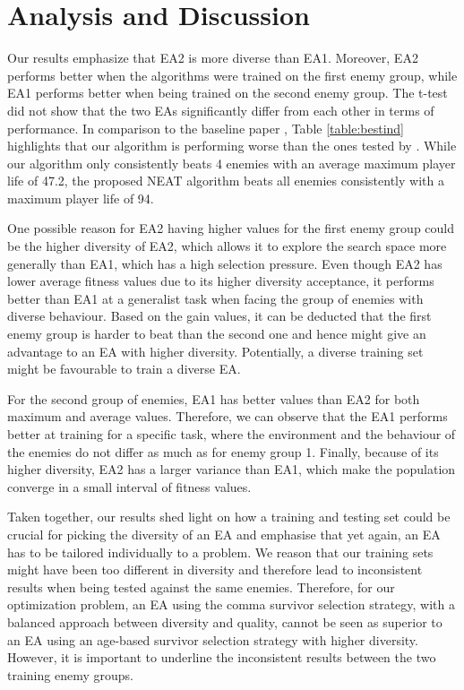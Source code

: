 \section{Analysis and Discussion}

Our results emphasize that EA2 is more diverse than EA1. Moreover, EA2 performs better when the algorithms were trained on the first enemy group, while EA1 performs better when being trained on the second enemy group. The t-test did not show that the two EAs significantly differ from each other in terms of performance. In comparison to the baseline paper \cite{Arajo2016EvolvingAG}, Table \ref{table:bestind} highlights that our algorithm is performing worse than the ones tested by \cite{Arajo2016EvolvingAG}. While our algorithm only consistently beats 4 enemies with an average maximum player life of 47.2, the proposed NEAT algorithm beats all enemies consistently with a maximum player life of 94.

One possible reason for EA2 having higher values for the first enemy group could be the higher diversity of EA2, which allows it to explore the search space more generally than EA1, which has a high selection pressure. Even though EA2 has lower average fitness values due to its higher diversity acceptance, it performs better than EA1 at a generalist task when facing the group of enemies with diverse behaviour. Based on the gain values, it can be deducted that the first enemy group is harder to beat than the second one and hence might give an advantage to an EA with higher diversity. Potentially, a diverse training set might be favourable to train a diverse EA. 

For the second group of enemies, EA1 has better values than EA2 for both maximum and average values. Therefore, we can observe that the EA1 performs better at training for a specific task, where the environment and the behaviour of the enemies do not differ as much as for enemy group 1. Finally, because of its higher diversity, EA2 has a larger variance than EA1, which make the population converge in a small interval of fitness values.

Taken together, our results shed light on how a training and testing set could be crucial for picking the diversity of an EA and emphasise that yet again, an EA has to be tailored individually to a problem. We reason that our training sets might have been too different in diversity and therefore lead to inconsistent results when being tested against the same enemies. Therefore, for our optimization problem, an EA using the comma survivor selection strategy, with a balanced approach between diversity and quality, cannot be seen as superior to an EA using an age-based survivor selection strategy with higher diversity. However, it is important to underline the inconsistent results between the two training enemy groups. 